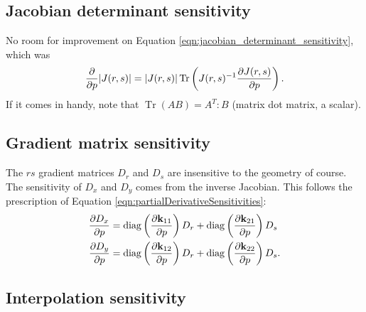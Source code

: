 \subsection{Jacobian determinant sensitivity}

No room for improvement on Equation \ref{eqn:jacobian_determinant_sensitivity}, which was
%
\begin{equation}
\frac{\partial{}}{\partial{p}} |J(r,s)| = |J(r,s)| \operatorname{Tr} \left( J(r,s)^{-1} \frac{\partial{J(r,s)}}{\partial{p}} \right).
\end{equation}
%
If it comes in handy, note that $\operatorname{Tr}(AB) = A^T : B$ (matrix dot matrix, a scalar).

\subsection{Gradient matrix sensitivity}

The $rs$ gradient matrices $D_r$ and $D_s$ are insensitive to the geometry of course.  The sensitivity of $D_x$ and $D_y$ comes from the inverse Jacobian.  This follows the prescription of Equation \ref{eqn:partialDerivativeSensitivities}:
%
\begin{equation}
\begin{aligned}
\frac{\partial{D_x}}{\partial{p}} &= \operatorname{diag} \left( \frac{\partial{\textbf{k}_{11}}}{\partial{p}} \right) D_r + \operatorname{diag} \left( \frac{\partial{\textbf{k}_{21}}}{\partial{p}} \right) D_s \\
\frac{\partial{D_y}}{\partial{p}} &= \operatorname{diag} \left( \frac{\partial{\textbf{k}_{12}}}{\partial{p}} \right) D_r + \operatorname{diag} \left( \frac{\partial{\textbf{k}_{22}}}{\partial{p}} \right) D_s. \\
\end{aligned}
\end{equation}

\subsection{Interpolation sensitivity}

